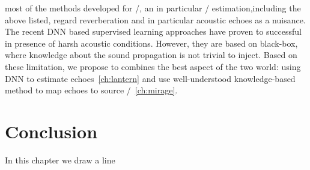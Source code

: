  most of the methods developed for \SSL/, an in particular \DOAs/ estimation,including the above listed, regard reverberation and in particular acoustic echoes as a nuisance.
The recent \ac{DNN} based supervised learning approaches have proven to successful in presence of harsh acoustic conditions.
However, they are based on black-box, where knowledge about the sound propagation is not trivial to inject.
Based on these limitation, we propose to combines the best aspect of the two world:
using \ac{DNN} to estimate echoes~\cref{ch:lantern} and use well-understood knowledge-based method to map echoes to source \DOAs/~\cref{ch:mirage}.







\section{Conclusion}\label{sec:application:conclusion}
In this chapter we draw a line

